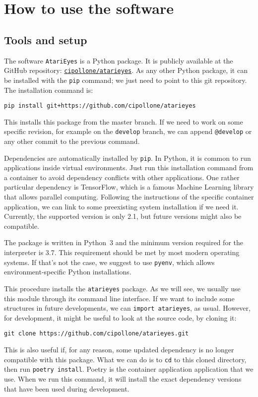 \section{How to use the software}

\label{sec:how-to-use}

\lstset{style=bash}

\subsection{Tools and setup}

The software \texttt{AtariEyes} is a Python package. It is publicly available
at the GitHub repository:
\href{https://github.com/cipollone/atarieyes}{\texttt{cipollone/atarieyes}}.
As any other Python package, it can be installed with the \texttt{pip}
command; we just need to point to this git repository. The installation
command is:
\begin{lstlisting}
pip install git+https://github.com/cipollone/atarieyes
\end{lstlisting}
This installs this package from the master branch. If we need to work on some
specific revision, for example on the \texttt{develop} branch, we can append
\verb!@develop! or any other commit to the previous command.

Dependencies are automatically installed by \texttt{pip}.  In Python, it is
common to run applications inside virtual environments. Just run this
installation command from a container to avoid dependency conflicts with
other applications. One rather particular dependency is TensorFlow, which is a
famous Machine Learning library that allows parallel computing. Following the
instructions of the specific container application, we can link to some
preexisting system installation if we need it. Currently, the supported
version is only 2.1, but future versions might also be compatible.

The package is written in Python~3 and the minimum version required for the
interpreter is 3.7. This requirement should be met by most modern operating
systems. If that's not the case, we suggest to use \texttt{pyenv}, which
allows environment-specific Python installations.

This procedure installs the \texttt{atarieyes} package. As we will see, we
usually use this module through its command line interface. If we want to
include some structures in future developments, we can
\lstinline[style=inlinepy]|import atarieyes|, as usual. However, for
development, it might be useful to look at the source code, by cloning it:
\begin{lstlisting}
git clone https://github.com/cipollone/atarieyes.git
\end{lstlisting}
This is also useful if, for any reason, some updated dependency is no longer
compatible with this package. What we can do is to \texttt{cd} to this cloned
directory, then run \texttt{poetry install}. Poetry is the container
application application that we use. When we run this command, it will install
the exact dependency versions that have been used during development.


